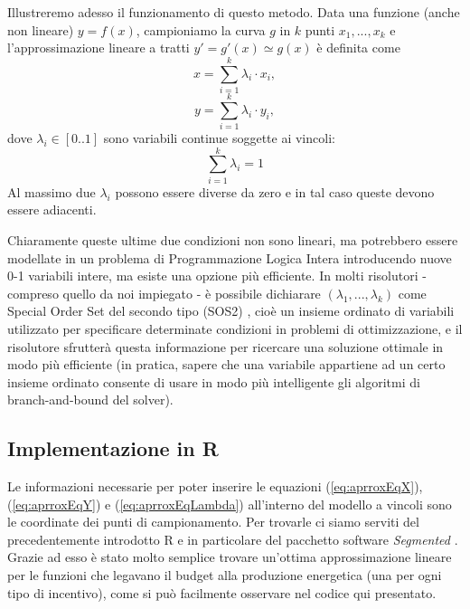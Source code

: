 Illustreremo adesso il funzionamento di questo metodo. Data una funzione (anche non lineare) $y=f(x)$, campioniamo la curva $g$ in $k$ punti $x_1,...,x_k$ e l'approssimazione lineare a tratti $y'=g'(x)\simeq g(x)$ è definita come
\begin{equation} 
\label{eq:aprroxEqX}
	x = \sum_{i=1}^k \lambda_i \cdot x_i,
\end{equation}
\begin{equation} 
\label{eq:aprroxEqY}
	y = \sum_{i=1}^k \lambda_i \cdot y_i,
\end{equation}
dove $\lambda_i \in [0..1]$ sono variabili continue soggette ai vincoli:
\begin{equation} 
\label{eq:aprroxEqLambda}
		\sum_{i=1}^k \lambda_i = 1
\end{equation}
Al massimo due $\lambda_i$ possono essere diverse da zero e in tal caso queste devono essere adiacenti.

Chiaramente queste ultime due condizioni non sono lineari, ma potrebbero essere modellate in un problema di Programmazione Logica Intera introducendo nuove 0-1 variabili intere, ma esiste una opzione più efficiente. In molti risolutori - compreso quello da noi impiegato - è possibile dichiarare $(\lambda_1,...,\lambda_k)$ come Special Order Set del secondo tipo (SOS2) \cite{bealeTomlin}, cioè un insieme ordinato di variabili utilizzato per specificare  determinate condizioni in problemi di ottimizzazione, e il risolutore sfrutterà questa informazione per ricercare una soluzione ottimale in modo più efficiente (in pratica, sapere che una variabile appartiene ad un certo insieme ordinato consente di usare in modo più intelligente gli algoritmi di branch-and-bound del solver).

\subsection{Implementazione in R}

Le informazioni necessarie per poter inserire le equazioni (\ref{eq:aprroxEqX}), (\ref{eq:aprroxEqY}) e (\ref{eq:aprroxEqLambda}) all'interno del modello a vincoli sono le coordinate dei punti di campionamento. Per trovarle ci siamo serviti del precedentemente introdotto R e in particolare del pacchetto software \emph{Segmented} \cite{segmentedPackage}. Grazie ad esso è stato molto semplice trovare un'ottima approssimazione lineare per le funzioni che legavano il budget alla produzione energetica (una per ogni tipo di incentivo), come si può facilmente osservare nel codice qui presentato.

